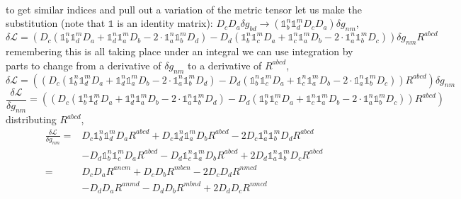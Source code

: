 \documentclass[aps,prd,preprint]{revtex4-1}
\begin{document}
\begin{fleqn}
\begin{align*}
\end{align*}
to get similar indices and pull out a variation of the metric tensor let us make the substitution (note that $\mathds{1}$ is an identity matrix): $D_c D_a \delta g_{bd} \rightarrow (\mathds{1}^n_b \mathds{1}^m_d D_c D_a) \delta g_{nm}$,
\begin{equation*}
    \delta \mathcal{L} = \left( D_c (\mathds{1}^n_b \mathds{1}^m_d D_a + \mathds{1}^n_d \mathds{1}^m_a D_b - 2 \cdot \mathds{1}^n_a \mathds{1}^m_b D_d) - D_d (\mathds{1}^n_b \mathds{1}^m_c D_a + \mathds{1}^n_c \mathds{1}^m_a D_b - 2 \cdot \mathds{1}^n_a \mathds{1}^m_b D_c) \right) \delta g_{nm} R^{abcd}
\end{equation*}
remembering this is all taking place under an integral we can use integration by parts to change from a derivative of $\delta g_{nm}$ to a derivative of $R^{abcd}$,
\begin{equation*}
    \delta \mathcal{L} = \left( \left( D_c (\mathds{1}^n_b \mathds{1}^m_d D_a + \mathds{1}^n_d \mathds{1}^m_a D_b - 2 \cdot \mathds{1}^n_a \mathds{1}^m_b D_d) - D_d (\mathds{1}^n_b \mathds{1}^m_c D_a + \mathds{1}^n_c \mathds{1}^m_a D_b - 2 \cdot \mathds{1}^n_a \mathds{1}^m_b D_c) \right) R^{abcd} \right) \delta g_{nm}
\end{equation*}
\begin{equation*}
    \frac{\delta \mathcal{L}}{\delta g_{nm}} = \left( \left( D_c (\mathds{1}^n_b \mathds{1}^m_d D_a + \mathds{1}^n_d \mathds{1}^m_a D_b - 2 \cdot \mathds{1}^n_a \mathds{1}^m_b D_d) - D_d (\mathds{1}^n_b \mathds{1}^m_c D_a + \mathds{1}^n_c \mathds{1}^m_a D_b - 2 \cdot \mathds{1}^n_a \mathds{1}^m_b D_c) \right) R^{abcd} \right)
\end{equation*}
distributing $R^{abcd}$,
\begin{equation*}
\begin{aligned}
    \frac{\delta \mathcal{L}}{\delta g_{nm}} = &D_c \mathds{1}^n_b \mathds{1}^m_d D_a R^{abcd} + D_c \mathds{1}^n_d \mathds{1}^m_a D_b R^{abcd} - 2 D_c \mathds{1}^n_a \mathds{1}^m_b D_d R^{abcd} \\
    &- D_d \mathds{1}^n_b \mathds{1}^m_c D_a R^{abcd} - D_d \mathds{1}^n_c \mathds{1}^m_a D_b R^{abcd} + 2 D_d \mathds{1}^n_a \mathds{1}^m_b D_c R^{abcd} \\
    = &D_c D_a R^{ancm} + D_c D_b R^{mbcn} - 2 D_c D_d R^{nmcd} \\
    &- D_d D_a R^{anmd} - D_d D_b R^{mbnd} + 2 D_d D_c R^{nmcd}
\end{aligned}
\end{equation*}

\end{fleqn}
\end{document}

